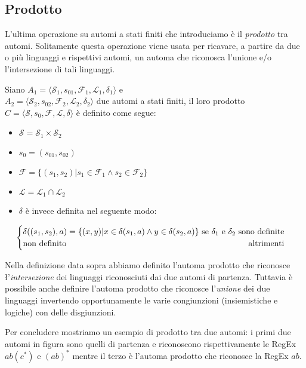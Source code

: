 \subsection{Prodotto}
L'ultima operazione su automi a stati finiti che introduciamo è il \emph{prodotto} tra automi. Solitamente questa operazione viene usata per ricavare, a partire da due o più linguaggi e rispettivi automi, un automa che riconosca l'unione e/o l'intersezione di tali linguaggi.
\begin{definition} \label{def:FSA_Product}
    Siano $A_1 = \langle \mathcal{S}_1, s_{01}, \mathcal{F}_1, \mathcal{L}_1, \delta_1 \rangle$ e \\ $A_2 = \langle \mathcal{S}_2, s_{02}, \mathcal{F}_2, \mathcal{L}_2, \delta_2 \rangle$ due automi a stati finiti, il loro prodotto $C = \langle \mathcal{S}, s_0, \mathcal{F}, \mathcal{L}, \delta \rangle$ è definito come segue:
    \begin{itemize}
        \item   $\mathcal{S} = \mathcal{S}_1 \times \mathcal{S}_2$
        \item $s_0 = (s_{01}, s_{02})$
        \item $\mathcal{F} = \{ (s_1, s_2) | s_1 \in \mathcal{F}_1 \land s_2 \in \mathcal{F}_2 \}$
        \item $\mathcal{L} = \mathcal{L}_1 \cap \mathcal{L}_2$
        \item $\delta$ è invece definita nel seguente modo:
    \end{itemize}
    \begin{equation*}
        \begin{cases}
            \text{$\delta ((s_1, s_2), a) = \{ (x,y) | x \in \delta(s_1, a) \land y \in \delta(s_2, a) \}$ \hfill se $\delta_1$ e $\delta_2$ sono definite} \\
            \text{non definito} \hfill \text{altrimenti}
        \end{cases}
    \end{equation*}
\end{definition}
\begin{remark}
    Nella definizione data sopra abbiamo definito l'automa prodotto che riconosce \l'\emph{intersezione} dei linguaggi riconosciuti dai due automi di partenza. Tuttavia è possibile anche definire l'automa prodotto che riconosce l'\emph{unione} dei due linguaggi invertendo opportunamente le varie congiunzioni (insiemistiche e logiche) con delle disgiunzioni.
\end{remark}
Per concludere mostriamo un esempio di prodotto tra due automi: i primi due automi in figura sono quelli di partenza e riconoscono rispettivamente le RegEx $ab(c^*)$ e $(ab)^*$ mentre il terzo è l'automa prodotto che riconosce la RegEx $ab$.
